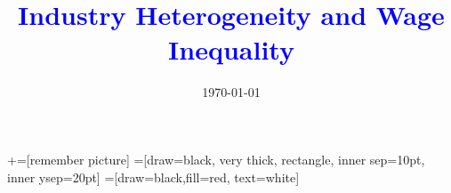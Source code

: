 \documentclass[notes,11pt, aspectratio=169]{beamer}
\title[]{\textcolor{blue}{Industry Heterogeneity and Wage Inequality}}
\author[MVB]{}
\institute[UW-Madison]{Mitchell Valdes-Bobes}
\date{\today}
\newenvironment{transitionframe}{
 \setbeamercolor{background canvas}{bg=yellow}
 \begin{frame}}{
 \end{frame}
}
\newenvironment{wideitemize}{\itemize\addtolength{\itemsep}{10pt}}{\enditemize}
\begin{document}
\newcommand\marktopleft[1]{%
 \tikz[overlay,remember picture] 
 \node (marker-#1-a) at (-.3em,.3em) {};%
}
\newcommand\markbottomright[2]{%
 \tikz[overlay,remember picture] 
 \node (marker-#1-b) at (0em,0em) {};%
}
+=[remember picture] 
 =[draw=black, very thick, rectangle, inner sep=10pt, inner ysep=20pt]
 =[draw=black,fill=red, text=white]

\begin{frame}
 \maketitle
\end{frame}

\end{document}
